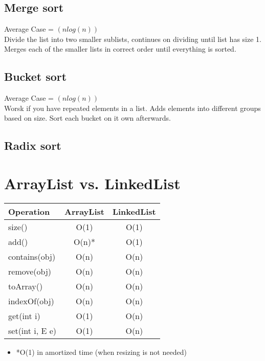 \documentclass{article}
\begin{document}
\subsection{Merge sort}
Average Case = $(nlog(n))$\\
Divide the list into two smaller sublists, continues on dividing until list has size 1. Merges each of the smaller lists in correct order until everything is sorted. 
\subsection{Bucket sort}
Average Case = $(nlog(n))$\\
Worsk if you have repeated elements in a list. Adds elements into different groups based on size. Sort each bucket on it own afterwards. 

\subsection{Radix sort}

\section{ArrayList vs. LinkedList}
\begin{table}[h!]
\centering
\begin{tabular}{|l|c|c|}
\hline
\textbf{Operation} & \textbf{ArrayList} & \textbf{LinkedList} \\
\hline
size() & O(1) & O(1) \\
\hline
add() & O(n)* & O(1) \\
\hline
contains(obj) & O(n) & O(n) \\
\hline
remove(obj) & O(n) & O(n) \\
\hline
toArray() & O(n) & O(n) \\
\hline
indexOf(obj) & O(n) & O(n) \\
\hline
get(int i) & O(1) & O(n) \\
\hline
set(int i, E e) & O(1) & O(n) \\
\hline
\end{tabular}
\end{table}
\begin{itemize}
  \item *O(1) in amortized time (when resizing is not needed)
\end{itemize}
\end{document}
